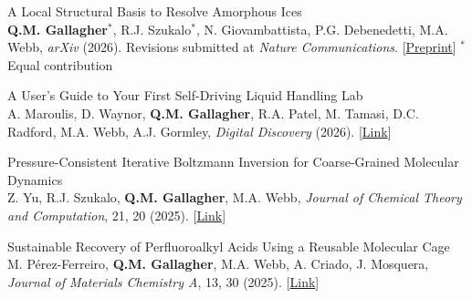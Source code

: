 \documentclass[letterpaper,11pt]{article}
\begin{document}
\begin{etaremune}
\item{\normalsize A Local Structural Basis to Resolve Amorphous Ices}\\
\vspace{2pt}
\small \textbf{Q.M. Gallagher}$^*$, R.J. Szukalo$^*$, N. Giovambattista, P.G. Debenedetti, M.A. Webb, \textit{arXiv} (2026). Revisions submitted at \textit{Nature Communications}. [\href{https://arxiv.org/abs/2601.17488}{Preprint}]
\vspace{2pt}\footnotesize $^*$Equal contribution

\normalsize \item{A User’s Guide to Your First Self-Driving Liquid Handling Lab}\\
\vspace{2pt}
\small A. Maroulis, D. Waynor, \textbf{Q.M. Gallagher}, R.A. Patel, M. Tamasi, D.C. Radford, M.A. Webb, A.J. Gormley, \textit{Digital Discovery} (2026). [\href{https://pubs.rsc.org/en/content/articlepdf/2025/dd/d5dd00525f}{Link}]

\normalsize \item{Pressure-Consistent Iterative Boltzmann Inversion
for Coarse-Grained Molecular Dynamics}\\
\vspace{2pt}
\small Z. Yu, R.J. Szukalo, \textbf{Q.M. Gallagher}, M.A. Webb, \textit{Journal of Chemical Theory and Computation}, 21, 20 (2025). [\href{https://doi.org/10.1021/acs.jctc.5c01190}{Link}]

\normalsize \item{Sustainable Recovery of Perfluoroalkyl Acids Using a Reusable Molecular Cage}\\
\vspace{2pt}
\small M. Pérez-Ferreiro, \textbf{Q.M. Gallagher}, M.A. Webb, A. Criado, J. Mosquera, \textit{Journal of Materials Chemistry A}, 13, 30 (2025). [\href{https:www.doi.org/10.1039/d5ta02758f}{Link}]


\end{etaremune}
\end{document}
